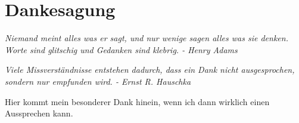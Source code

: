 \chapter*{Dankesagung}
\thispagestyle{empty}

\begin{displayquote}
\textit{Niemand meint alles was er sagt, und nur wenige sagen alles was sie denken. Worte sind glitschig und Gedanken sind klebrig. - Henry Adams}
\end{displayquote}

\begin{displayquote}
\textit{Viele Missverständnisse entstehen dadurch, dass ein Dank nicht ausgesprochen, sondern nur empfunden wird. - Ernst R. Hauschka}
\end{displayquote}
Hier kommt mein besonderer Dank hinein, wenn ich dann wirklich einen Aussprechen kann.


\newpage